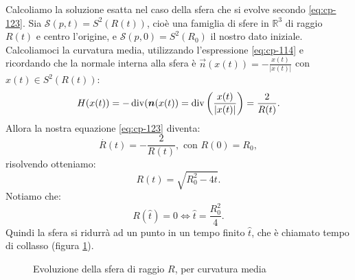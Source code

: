 \begin{esempio}
Calcoliamo la soluzione esatta nel caso della sfera che si evolve secondo  \eqref{eq:cp-123}. Sia $\mathcal{S}(p,t) = S^2(R(t))$, cioè una famiglia di sfere in $\mathbb{R}^3$ di raggio $R(t)$ e centro l'origine, e $\mathcal{S}(p,0) = S^2(R_0)$ il nostro dato iniziale. Calcoliamoci la curvatura media, utilizzando l'espressione \eqref{eq:cp-114} e ricordando che la normale interna alla sfera è $\vec{n}(x(t))=-\frac{x(t)}{|x(t)|}$ con $x(t)\in S^2(R(t))$:
\[
H(x(t)) =-\operatorname{div}(\bm{n}(x(t))=\operatorname{div}\left(\frac{x(t)}{|x(t)|}\right)=\frac{2}{R(t)}.   
\]
Allora la nostra equazione \eqref{eq:cp-123} diventa:
\[
\overset{\displaystyle.}{R}(t)=-\frac{2}{R(t)}, \text{ con } R(0) = R_0,
\]
risolvendo otteniamo:
\[
R(t)=\sqrt{R_0^2-4t}.
\]
Notiamo che:
\[
R(\hat{t})=0 \Longleftrightarrow \hat{t}=\frac{R_0^2}{4}.
\]
Quindi la sfera si ridurrà ad un punto in un tempo finito $\hat{t}$, che è chiamato tempo di collasso (figura \ref{fig:cp-121}).

\begin{figure}[!htbp]
  \begin{center}
  \end{center}
  \caption{Evoluzione della sfera di raggio $R$, per curvatura media}
  \label{fig:cp-121}
\end{figure}
\end{esempio}

